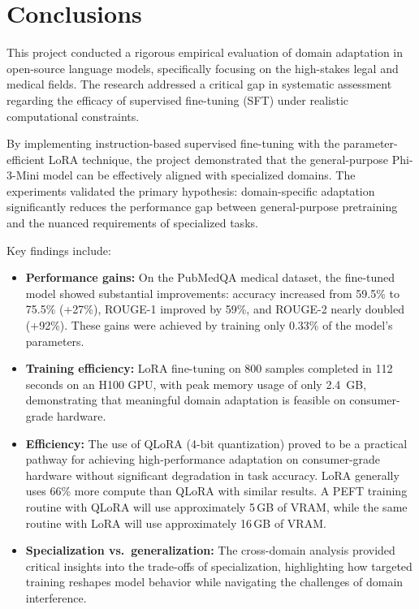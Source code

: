 \documentclass[12pt, letterpaper]{article}
\begin{document}
\section{Conclusions}
\label{sec:conclusions}

This project conducted a rigorous empirical evaluation of domain adaptation in open-source language models, specifically focusing on the high-stakes legal and medical fields. The research addressed a critical gap in systematic assessment regarding the efficacy of supervised fine-tuning (SFT) under realistic computational constraints.

By implementing instruction-based supervised fine-tuning with the parameter-efficient LoRA technique, the project demonstrated that the general-purpose Phi-3-Mini model can be effectively aligned with specialized domains. The experiments validated the primary hypothesis: domain-specific adaptation significantly reduces the performance gap between general-purpose pretraining and the nuanced requirements of specialized tasks.

Key findings include:

\begin{itemize}
    \item \textbf{Performance gains:} On the PubMedQA medical dataset, the fine-tuned model showed substantial improvements: accuracy increased from 59.5\% to 75.5\% (+27\%), ROUGE-1 improved by 59\%, and ROUGE-2 nearly doubled (+92\%). These gains were achieved by training only 0.33\% of the model's parameters.

    \item \textbf{Training efficiency:} LoRA fine-tuning on 800 samples completed in 112 seconds on an H100 GPU, with peak memory usage of only 2.4~GB, demonstrating that meaningful domain adaptation is feasible on consumer-grade hardware.

    \item \textbf{Efficiency:} The use of QLoRA (4-bit quantization) proved to be a practical pathway for achieving high-performance adaptation on consumer-grade hardware without significant degradation in task accuracy. LoRA generally uses 66\% more compute than QLoRA with similar results. A PEFT training routine with QLoRA will use approximately 5\,GB of VRAM, while the same routine with LoRA will use approximately 16\,GB of VRAM.

    \item \textbf{Specialization vs.\ generalization:} The cross-domain analysis provided critical insights into the trade-offs of specialization, highlighting how targeted training reshapes model behavior while navigating the challenges of domain interference.
\end{itemize}
\end{document}
